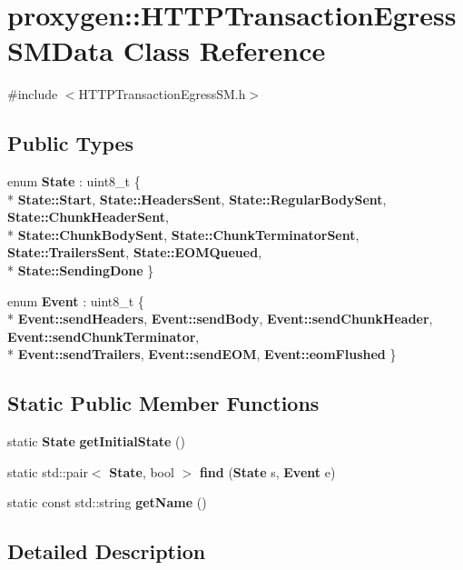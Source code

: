\section{proxygen\+:\+:H\+T\+T\+P\+Transaction\+Egress\+S\+M\+Data Class Reference}
\label{classproxygen_1_1HTTPTransactionEgressSMData}


{\ttfamily \#include $<$H\+T\+T\+P\+Transaction\+Egress\+S\+M.\+h$>$}

\subsection*{Public Types}
\begin{DoxyCompactItemize}
\item 
enum {\bf State} \+: uint8\+\_\+t \{ \\*
{\bf State\+::\+Start}, 
{\bf State\+::\+Headers\+Sent}, 
{\bf State\+::\+Regular\+Body\+Sent}, 
{\bf State\+::\+Chunk\+Header\+Sent}, 
\\*
{\bf State\+::\+Chunk\+Body\+Sent}, 
{\bf State\+::\+Chunk\+Terminator\+Sent}, 
{\bf State\+::\+Trailers\+Sent}, 
{\bf State\+::\+E\+O\+M\+Queued}, 
\\*
{\bf State\+::\+Sending\+Done}
 \}
\item 
enum {\bf Event} \+: uint8\+\_\+t \{ \\*
{\bf Event\+::send\+Headers}, 
{\bf Event\+::send\+Body}, 
{\bf Event\+::send\+Chunk\+Header}, 
{\bf Event\+::send\+Chunk\+Terminator}, 
\\*
{\bf Event\+::send\+Trailers}, 
{\bf Event\+::send\+E\+OM}, 
{\bf Event\+::eom\+Flushed}
 \}
\end{DoxyCompactItemize}
\subsection*{Static Public Member Functions}
\begin{DoxyCompactItemize}
\item 
static {\bf State} {\bf get\+Initial\+State} ()
\item 
static std\+::pair$<$ {\bf State}, bool $>$ {\bf find} ({\bf State} s, {\bf Event} e)
\item 
static const std\+::string {\bf get\+Name} ()
\end{DoxyCompactItemize}


\subsection{Detailed Description}


